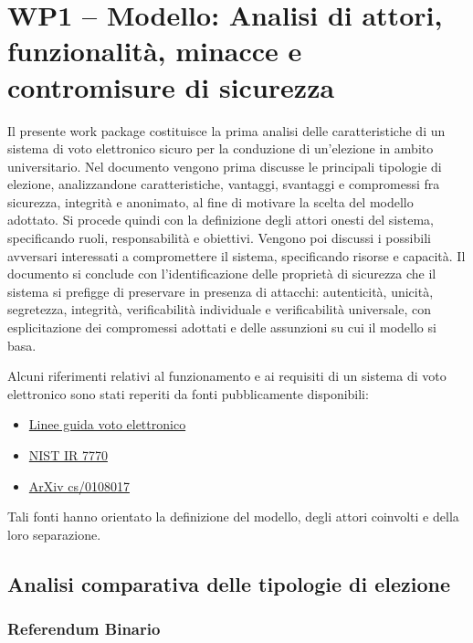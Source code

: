 \documentclass[12pt,a4paper]{article}
\begin{document}
\section{WP1 – Modello: Analisi di attori, funzionalità, minacce e contromisure di sicurezza}

Il presente work package costituisce la prima analisi delle caratteristiche di un sistema di
voto elettronico sicuro per la conduzione di un'elezione in ambito universitario. Nel documento
vengono prima discusse le principali tipologie di elezione, analizzandone caratteristiche,
vantaggi, svantaggi e compromessi fra sicurezza, integrità e anonimato, al fine di motivare
la scelta del modello adottato. Si procede quindi con la definizione degli attori onesti del
sistema, specificando ruoli, responsabilità e obiettivi. Vengono poi discussi i possibili
avversari interessati a compromettere il sistema, specificando risorse e capacità. Il documento
si conclude con l'identificazione delle proprietà di sicurezza che il sistema si prefigge di
preservare in presenza di attacchi: autenticità, unicità, segretezza, integrità, verificabilità
individuale e verificabilità universale, con esplicitazione dei compromessi adottati e delle
assunzioni su cui il modello si basa.

Alcuni riferimenti relativi al funzionamento e ai requisiti di un sistema di voto elettronico
sono stati reperiti da fonti pubblicamente disponibili:
\begin{itemize}
  \item \href{https://www.interno.gov.it/sites/default/files/2021-07/linee_guida_voto_elettronico_decreto_9.7.2021.pdf}{Linee guida voto elettronico}
  \item \href{https://nvlpubs.nist.gov/nistpubs/Legacy/IR/nistir7770.pdf}{NIST IR 7770}
  \item \href{https://arxiv.org/pdf/cs/0108017}{ArXiv cs/0108017}
\end{itemize}

Tali fonti hanno orientato la definizione del modello, degli attori coinvolti e della loro
separazione.

\subsection{Analisi comparativa delle tipologie di elezione}

\subsubsection{Referendum Binario}
\end{document}
